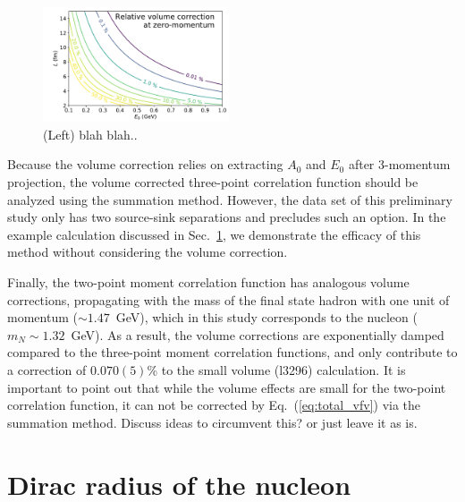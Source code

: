 \documentclass[prd,aps,twocolumn,superscriptaddress,tightenlines,nofootinbib,floatfix,preprintnumbers,10pt]{revtex4-1}
\begin{document}
\begin{figure}[t]{
		\includegraphics[width=0.49\textwidth]{figures/fv_relerr_0mom.pdf}
		\caption{(Left) blah blah..}
		\label{fig:fv_relerr}
}\end{figure}

Because the volume correction relies on extracting $A_0$ and $E_0$ after 3-momentum projection, the volume corrected three-point correlation function should be analyzed using the summation method. However, the data set of this preliminary study only has two source-sink separations and precludes such an option. In the example calculation discussed in Sec.~\ref{sec:results}, we demonstrate the efficacy of this method without considering the volume correction.

Finally, the two-point moment correlation function has analogous volume corrections, propagating with the mass of the final state hadron with one unit of momentum ($\sim 1.47$~GeV), which in this study corresponds to the nucleon ($m_N \sim 1.32$~GeV). As a result, the volume corrections are exponentially damped compared to the three-point moment correlation functions, and only contribute to a correction of $0.070(5)$\% to the small volume (l3296) calculation. It is important to point out that while the volume effects are small for the two-point correlation function, it can not be corrected by Eq.~(\ref{eq:total_vfv}) via the summation method. {\color{red} Discuss ideas to circumvent this? or just leave it as is.}


\section{Dirac radius of the nucleon}\label{sec:results}
\end{document}
